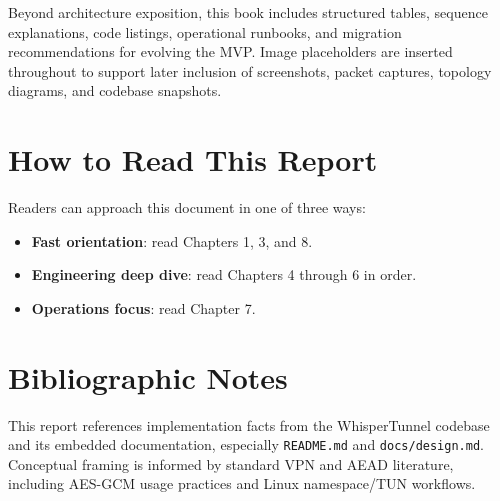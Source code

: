 \documentclass[11pt,oneside]{book}
\begin{document}
Beyond architecture exposition, this book includes structured tables, sequence explanations, code listings, operational runbooks, and migration recommendations for evolving the MVP. Image placeholders are inserted throughout to support later inclusion of screenshots, packet captures, topology diagrams, and codebase snapshots.

\chapter*{How to Read This Report}
Readers can approach this document in one of three ways:
\begin{itemize}[leftmargin=2em]
\item \textbf{Fast orientation}: read Chapters 1, 3, and 8.
\item \textbf{Engineering deep dive}: read Chapters 4 through 6 in order.
\item \textbf{Operations focus}: read Chapter 7.
\end{itemize}

\tableofcontents
\listoffigures
\listoftables
\clearpage

\mainmatter










\backmatter

\chapter*{Bibliographic Notes}
This report references implementation facts from the WhisperTunnel codebase and its embedded documentation, especially \texttt{README.md} and \texttt{docs/design.md}. Conceptual framing is informed by standard VPN and AEAD literature, including AES-GCM usage practices and Linux namespace/TUN workflows.
\end{document}
